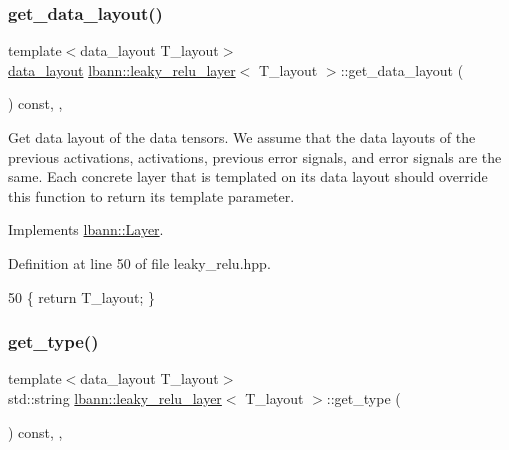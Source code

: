 \subsubsection{\texorpdfstring{get\+\_\+data\+\_\+layout()}{get\_data\_layout()}}
{\footnotesize\ttfamily template$<$data\+\_\+layout T\+\_\+layout$>$ \\
\hyperlink{base_8hpp_a786677cbfb3f5677b4d84f3056eb08db}{data\+\_\+layout} \hyperlink{classlbann_1_1leaky__relu__layer}{lbann\+::leaky\+\_\+relu\+\_\+layer}$<$ T\+\_\+layout $>$\+::get\+\_\+data\+\_\+layout (\begin{DoxyParamCaption}{ }\end{DoxyParamCaption}) const\hspace{0.3cm}{\ttfamily [inline]}, {\ttfamily [override]}, {\ttfamily [virtual]}}

Get data layout of the data tensors. We assume that the data layouts of the previous activations, activations, previous error signals, and error signals are the same. Each concrete layer that is templated on its data layout should override this function to return its template parameter. 

Implements \hyperlink{classlbann_1_1Layer_a5dfb66e81fc085997402a5e2241316bd}{lbann\+::\+Layer}.



Definition at line 50 of file leaky\+\_\+relu.\+hpp.


\begin{DoxyCode}
50 \{ \textcolor{keywordflow}{return} T\_layout; \}
\end{DoxyCode}
\mbox{\label{classlbann_1_1leaky__relu__layer_a76f9d4a88ffedc6bf38f6cccb88e9894}} 
\subsubsection{\texorpdfstring{get\+\_\+type()}{get\_type()}}
{\footnotesize\ttfamily template$<$data\+\_\+layout T\+\_\+layout$>$ \\
std\+::string \hyperlink{classlbann_1_1leaky__relu__layer}{lbann\+::leaky\+\_\+relu\+\_\+layer}$<$ T\+\_\+layout $>$\+::get\+\_\+type (\begin{DoxyParamCaption}{ }\end{DoxyParamCaption}) const\hspace{0.3cm}{\ttfamily [inline]}, {\ttfamily [override]}, {\ttfamily [virtual]}}

